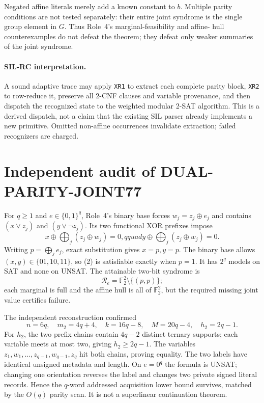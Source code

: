 \documentclass[11pt]{article}
\begin{document}
Negated affine literals merely add a known constant to $b$.  Multiple parity
conditions are not tested separately: their entire joint syndrome is the
single group element in $G$.  Thus Role~4's marginal-feasibility and affine-
hull counterexamples do not defeat the theorem; they defeat only weaker
summaries of the joint syndrome.

\paragraph{SIL-RC interpretation.}
A sound adaptive trace may apply \texttt{XR1} to extract each complete parity
block, \texttt{XR2} to row-reduce it, preserve all 2-CNF clauses and variable
provenance, and then dispatch the recognized state to the weighted modular
2-SAT algorithm.  This is a derived dispatch, not a claim that the existing
SIL parser already implements a new primitive.  Omitted non-affine
occurrences invalidate extraction; failed recognizers are charged.

\section{Independent audit of DUAL-PARITY-JOINT77}
For $q\ge1$ and $e\in\{0,1\}^q$, Role~4's binary base forces
$w_j=z_j\oplus e_j$ and contains $(x\vee z_j)$ and
$(y\vee\neg z_j)$.  Its two functional XOR prefixes impose
\[
x\oplus\bigoplus_j(z_j\oplus w_j)=0,qquad
y\oplus\bigoplus_j(z_j\oplus w_j)=0.                 \tag{2}
\]
Writing $p=\bigoplus_j e_j$, exact substitution gives $x=p,y=p$.
The binary base allows $(x,y)\in\{01,10,11\}$, so (2) is satisfiable exactly
when $p=1$.  It has $2^q$ models on SAT and none on UNSAT.  The attainable
two-bit syndrome is
\[
\mathcal R_e=\mathbb F_2^2\setminus\{(p,p)\};          \tag{3}
\]
each marginal is full and the affine hull is all of $\mathbb F_2^2$, but the
required missing joint value certifies failure.

The independent reconstruction confirmed
\[
n=6q,\quad m_2=4q+4,\quad k=16q-8,\quad M=20q-4,
\quad h_2=2q-1.                                       \tag{4}
\]
For $h_2$, the two prefix chains contain $4q-2$ distinct ternary supports;
each variable meets at most two, giving $h_2\ge2q-1$.  The variables
$z_1,w_1,\ldots,z_{q-1},w_{q-1},z_q$ hit both chains, proving equality.
The two labels have identical unsigned metadata and length.  On $e=0^q$ the
formula is UNSAT; changing one orientation reverses the label and changes two
private signed literal records.  Hence the $q$-word addressed acquisition
lower bound survives, matched by the $O(q)$ parity scan.  It is not a
superlinear continuation theorem.
\end{document}

